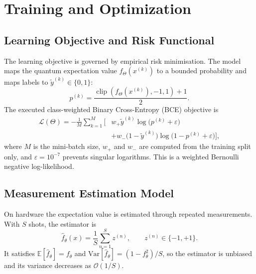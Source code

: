 \documentclass[conference]{IEEEtran}
\begin{document}
\section{Training and Optimization}
\subsection{Learning Objective and Risk Functional}
The learning objective is governed by empirical risk minimisation. The model maps the quantum expectation value $f_\Theta(x^{(k)})$ to a bounded probability and maps labels to $\tilde{y}^{(k)} \in \{0,1\}$:
\begin{equation}
p^{(k)} = \frac{\operatorname{clip}\!\left(f_\Theta(x^{(k)}),-1,1\right) + 1}{2}.
\end{equation}
The executed class-weighted Binary Cross-Entropy (BCE) objective is
\begin{equation}
\begin{aligned}
\mathcal{L}(\Theta) = -\frac{1}{M} \sum_{k=1}^{M} \Big[&w_{+}\tilde{y}^{(k)} \log\!\big(p^{(k)}+\varepsilon\big) \\
&+ w_{-}\big(1 - \tilde{y}^{(k)}\big) \log\!\big(1 - p^{(k)}+\varepsilon\big)\Big],
\end{aligned}
\end{equation}
where $M$ is the mini-batch size, $w_{+}$ and $w_{-}$ are computed from the training split only, and $\varepsilon=10^{-7}$ prevents singular logarithms. This is a weighted Bernoulli negative log-likelihood.

\subsection{Measurement Estimation Model}
On hardware the expectation value is estimated through repeated measurements. With $S$ shots, the estimator is
\begin{equation}
\hat{f}_\theta(x) = \frac{1}{S} \sum_{n=1}^{S} z^{(n)}, \qquad z^{(n)} \in \{-1, +1\}.
\end{equation}
It satisfies $\mathbb{E}[\hat{f}_\theta] = f_\theta$ and $\text{Var}[\hat{f}_\theta] = (1 - f_\theta^2)/S$, so the estimator is unbiased and its variance decreases as $\mathcal{O}(1/S)$.
\end{document}
